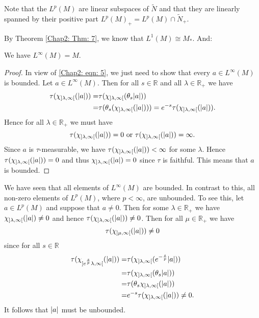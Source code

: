 Note that the $L^p(M)$ are linear subspaces of $\tilde{N}$ and that they are linearly spanned by their positive part $L^p(M)_+=L^p(M)\cap \tilde{N}_+$.\par 
By Theorem \ref{Chap2: Thm: 7}, we know that $L^1(M)\cong M_*$. And: 
\begin{proposition}\label{Chap2: Prop: 10}
    We have $L^\infty(M)=M$.
\end{proposition}
\begin{proof}
    In view of \eqref{Chap2: eqn: 5}, we just need to show that every $a\in L^\infty(M)$ is bounded. Let $a\in L^\infty(M)$. Then for all $s\in \mathbb{R}$ and all $\lambda\in \mathbb{R}_+$ we have
    \[
        \begin{split}
            \tau(\chi_{]\lambda,\infty[}(\abs{a}))=&\tau(\chi_{]\lambda,\infty[}(\theta_s\abs{a}))\\
            =&\tau(\theta_s(\chi_{]\lambda,\infty[}(\abs{a})))=e^{-s}\tau(\chi_{]\lambda,\infty[}(\abs{a})).
        \end{split}
    \]
    Hence for all $\lambda\in \mathbb{R}_+$ we must have 
    \[
        \tau(\chi_{]\lambda,\infty[}(\abs{a}))=0 \text{ or } \tau(\chi_{]\lambda,\infty[}(\abs{a}))=\infty.
    \]
Since $a$ is $\tau$-measurable, we have $\tau(\chi_{]\lambda,\infty[}(\abs{a}))<\infty$ for some $\lambda$. Hence $\tau(\chi_{]\lambda,\infty[}(\abs{a}))=0$ and thus $\chi_{]\lambda,\infty[}(\abs{a})=0$ since $\tau$ is faithful. This means that $a$ is bounded.
\end{proof}
\begin{remark}
    We have seen that all elements of $L^\infty(M)$ are bounded. In contrast to this, all non-zero elements of $L^p(M)$, where $p<\infty$, are unbounded. To see this, let $a\in L^p(M)$ and suppose that $a\neq 0$. Then for some $\lambda\in \mathbb{R}_+$ we have $\chi_{]\lambda,\infty[}(\abs{a})\neq 0$ and hence $\tau(\chi_{]\lambda,\infty[}(\abs{a}))\neq 0$. Then for all $\mu\in \mathbb{R}_+$ we have 
    \[
        \tau(\chi_{]\mu,\infty[}(\abs{a}))\neq 0
    \]
    since for all $s\in \mathbb{R}$
    \[
       \begin{split}
           \tau(\chi_{]e^\frac{s}{p}\lambda,\infty[}(\abs{a}))=&\tau(\chi_{]\lambda,\infty[}(e^{-\frac{s}{p}}\abs{a}))\\
           =&\tau(\chi_{]\lambda,\infty[}(\theta_s\abs{a}))\\
           =&\tau(\theta_s\chi_{]\lambda,\infty[}(\abs{a}))\\
           =&e^{-s}\tau(\chi_{]\lambda,\infty[}(\abs{a}))\neq 0.
       \end{split} 
    \]
    It follows that $\abs{a}$ must be unbounded.
\end{remark}
